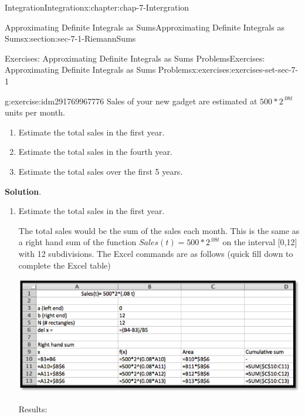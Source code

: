\documentclass[oneside,10pt,]{book}
\numberwithin{equation}{section}
\begin{document}
\begin{chapterptx}{Integration}{}{Integration}{}{}{x:chapter:chap-7-Intergration}
\begin{sectionptx}{Approximating Definite Integrals as Sums}{}{Approximating Definite Integrals as Sums}{}{}{x:section:sec-7-1-RiemannSums}
\begin{exercises-subsection}{Exercises: Approximating Definite Integrals as Sums Problems}{}{Exercises: Approximating Definite Integrals as Sums Problems}{}{}{x:exercises:exercises-set-sec-7-1}
\begin{divisionexercise}{11}{}{}{g:exercise:idm291769967776}%
Sales of your new gadget are estimated at \(500*2^{.08 t}\) units per month.%
%
\begin{enumerate}[label=(\alph*)]
\item{}Estimate the total sales in the first year.%
\item{}Estimate the total sales in the fourth year.%
\item{}Estimate the total sales over the first 5 years.%
\end{enumerate}
\par\smallskip%
\noindent\textbf{Solution}.\hypertarget{g:solution:idm291769964400}{}\quad{}%
\begin{enumerate}[label=(\alph*)]
\item{}Estimate the total sales in the first year.%
\par
The total sales would be the sum of the sales each month. This is the same as a right hand sum of the function \(Sales(t)= 500*2^{.08 t}\) on the interval [0,12] with 12 subdivisions. The Excel commands are as follows (quick fill down to complete the Excel table)%
\begin{sidebyside}{1}{0.1}{0.1}{0}%
\begin{sbspanel}{0.8}%
\includegraphics[width=\linewidth]{images/sec7-1-sol11a.png}
\end{sbspanel}%
\end{sidebyside}%
\par
Results:%
\begin{sidebyside}{1}{0.25}{0.25}{0}%
\begin{sbspanel}{0.5}%

\end{sbspanel}
\end{sidebyside}
\end{enumerate}
\end{divisionexercise}
\end{exercises-subsection}
\end{sectionptx}
\end{chapterptx}
\end{document}
